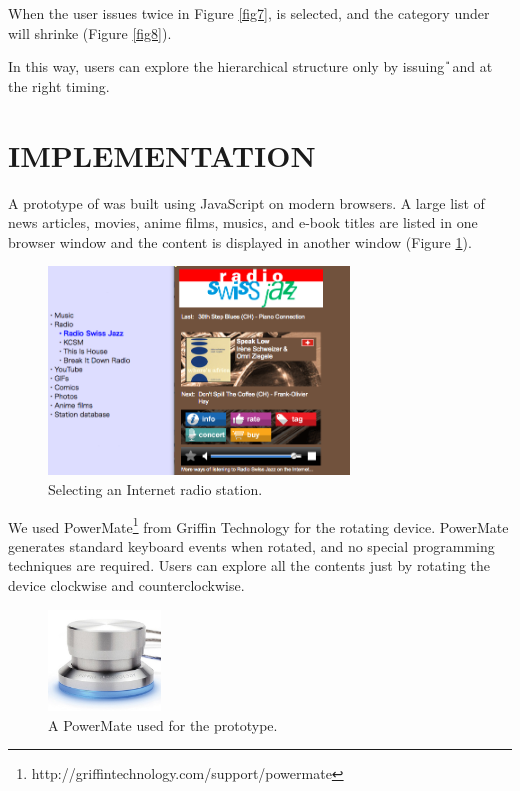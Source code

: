 \documentclass{article}
\begin{document}
When the user issues {\D} twice in Figure \ref{fig7},
 is selected, and the category under  will shrinke (Figure \ref{fig8}).

In this way, users can explore the hierarchical structure
only by issuing {\U} and {\D} at the right timing.

\section*{IMPLEMENTATION}

A prototype of {\ST} was built using JavaScript on modern browsers.
A large list of news articles, movies, anime films, musics, and e-book titles are listed in one browser window
and the content is displayed in another window (Figure \ref{screenshot}).

\begin{figure}[H]
\centerline{\includegraphics[width=80mm,bb=0 0 671 464]{figures/95cf2fec71c52ead6fdbcb7f79aca654.png}}
\caption{Selecting an Internet radio station.}
\label{screenshot}
\end{figure}

We used
PowerMate\footnote{
  \textsf{http://griffintechnology.com/support/powermate}
} from Griffin Technology for the rotating device.
PowerMate generates standard keyboard events when rotated,
and no special programming techniques are required.
%
Users can explore all the contents just by
rotating the device clockwise and counterclockwise.

\begin{figure}[H]
\centerline{\includegraphics[width=30mm,bb=0 0 389 348]{figures/d3a69499f7e7314ae6dc10f5bf3a2be5.png}}
\caption{A PowerMate used for the prototype.}
\label{powermate}
\end{figure}
\end{document}

